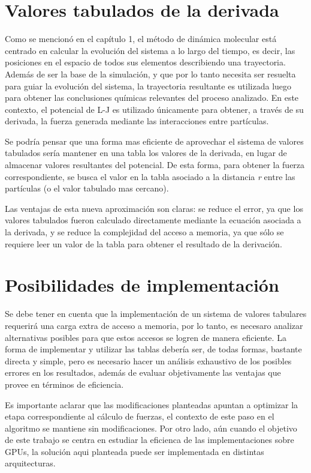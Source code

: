 \section{Valores tabulados de la derivada}

Como se mencionó en el capítulo 1, el método de dinámica molecular está centrado en calcular la evolución del sistema a lo largo del tiempo, es decir, las posiciones en el espacio de todos sus elementos describiendo una trayectoria. 
Además de ser la base de la simulación, y que por lo tanto necesita ser resuelta para guiar la evolución del sistema, la trayectoria resultante es utilizada luego para obtener las conclusiones químicas relevantes del proceso analizado. 
En este contexto, el potencial de L-J es utilizado únicamente para obtener, a través de su derivada, la fuerza generada mediante las interacciones entre partículas. 

Se podría pensar que una forma mas eficiente de aprovechar el sistema de valores tabulados sería mantener en una tabla los valores de la derivada, en lugar de almacenar valores resultantes del potencial. 
De esta forma, para obtener la fuerza correspondiente, se busca el valor en la tabla asociado a la distancia \textit{r} entre las partículas (o el valor tabulado mas cercano). 


Las ventajas de esta nueva aproximación son claras: se reduce el error, ya que los valores tabulados fueron calculado directamente mediante la ecuación asociada a la derivada, 
y se reduce la complejidad del acceso a memoria, ya que sólo se requiere leer un valor de la tabla para obtener el resultado de la derivación.


\section{Posibilidades de implementación}

Se debe tener en cuenta que la implementación de un sistema de valores tabulares requerirá una carga extra de acceso a memoria, por lo tanto, es necesaro analizar alternativas posibles para que estos accesos se logren de manera eficiente.
La forma de implementar y utilizar las tablas debería ser, de todas formas, bastante directa y simple, pero es necesario hacer un análisis exhaustivo de los posibles errores en los resultados,
además de evaluar objetivamente las ventajas que provee en términos de eficiencia.

Es importante aclarar que las modificaciones planteadas apuntan a optimizar la etapa correspondiente al cálculo de fuerzas, el contexto de este paso en el algoritmo se mantiene sin modificaciones.
Por otro lado, aún cuando el objetivo de este trabajo se centra en estudiar la eficienca de las implementaciones sobre GPUs, la solución aqui planteada puede ser implementada en distintas arquitecturas.
